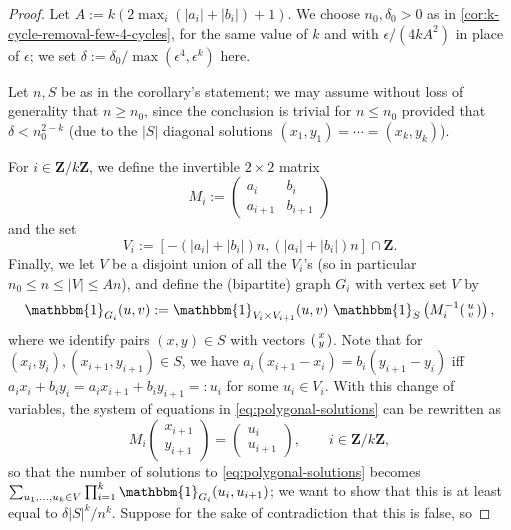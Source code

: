 \documentclass[reqno,11pt]{amsart}
\theoremstyle{definition}
\theoremstyle{remark}
\numberwithin{equation}{section}
\newcommand{\Z}{\mathbf{Z}}
\newcommand{\one}{\mathbbm{1}}
\newenvironment{psmall}
  {\left(\begin{smallmatrix}}
  {\end{smallmatrix}\right)}
\begin{document}
\begin{proof}
Let $A := k (2\max_i (|a_i| + |b_i|) + 1)$.
We choose $n_0, \delta_0 > 0$ as in \cref{cor:k-cycle-removal-few-4-cycles}, for the same value of $k$ and with $\epsilon/(4kA^2)$ in place of $\epsilon$; we set $\delta := \delta_0 / \max(\epsilon^4, \epsilon^k)$ here.

Let $n, S$ be as in the corollary's statement; we may assume without loss of generality that $n \ge n_0$, since the conclusion is trivial for $n \le n_0$ provided that $\delta < n_0^{2-k}$ (due to the $|S|$ diagonal solutions $(x_1, y_1) = \cdots = (x_k, y_k)$).

For $i \in \Z/k\Z$, we define the invertible $2 \times 2$ matrix %
\[
    M_i := 
    \begin{pmatrix}
        a_i & b_i \\
        a_{i+1} & b_{i+1}
    \end{pmatrix}
\]
and the set
\[
    V_i := [-(|a_i|+|b_i|)n, (|a_i|+|b_i|)n] \cap \Z.
\]
Finally, we let $V$ be a disjoint union of all the $V_i$'s (so in particular $n_0 \le n \le |V| \le An$), and define the (bipartite) graph $G_i$ with vertex set $V$ by
\[
    \one_{G_i}(u, v) := \one_{V_{i} \times V_{i+1}}(u, v)\ \one_S\left( M_i^{-1}\begin{psmall} u \\ v \end{psmall} \right),
\]
where we identify pairs $(x, y) \in S$ with vectors $\begin{psmall} x \\ y \end{psmall}$. Note that for $(x_i, y_i), (x_{i+1}, y_{i+1}) \in S$, we have $a_i(x_{i+1} - x_i) = b_i(y_{i+1} - y_i)$ iff $a_i x_i + b_i y_i = a_i x_{i+1} + b_i y_{i+1} =: u_i$ for some $u_i \in V_i$. With this change of variables, the system of equations in \cref{eq:polygonal-solutions} can be rewritten as
\[
    M_i \begin{pmatrix} x_{i+1} \\ y_{i+1} \end{pmatrix} = 
    \begin{pmatrix} u_i \\ u_{i+1} \end{pmatrix},
    \qquad i \in \Z/k\Z,
\]
so that the number of solutions to \cref{eq:polygonal-solutions} becomes $\sum_{u_1, \ldots, u_k \in V} \prod_{i=1}^k \one_{G_i}(u_i, u_{i+1})$;
we want to show that this is at least equal to $\delta |S|^k/n^k$. Suppose for the sake of contradiction that this is false, so

\end{proof}
\end{document}
